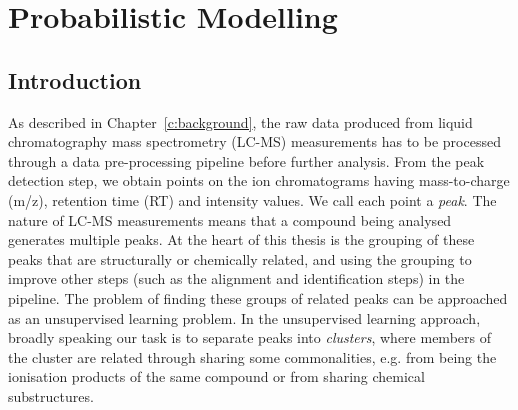 \chapter{Probabilistic Modelling}
\label{c:ml-background}


\section{Introduction}

As described in Chapter~\ref{c:background}, the raw data produced from liquid chromatography mass spectrometry (LC-MS) measurements has to be processed through a data pre-processing pipeline before further analysis. From the peak detection step, we obtain points on the ion chromatograms having mass-to-charge (m/z), retention time (RT) and intensity values. We call each point a \emph{peak}. The nature of LC-MS measurements means that a compound being analysed generates multiple peaks. At the heart of this thesis is the grouping of these peaks that are structurally or chemically related, and using the grouping to improve other steps (such as the alignment and identification steps) in the pipeline. The problem of finding these groups of related peaks can be approached as an unsupervised learning problem. In the unsupervised learning approach, broadly speaking our task is to separate peaks into \emph{clusters}, where members of the cluster are related through sharing some commonalities, e.g. from being the ionisation products of the same compound or from sharing chemical substructures.

